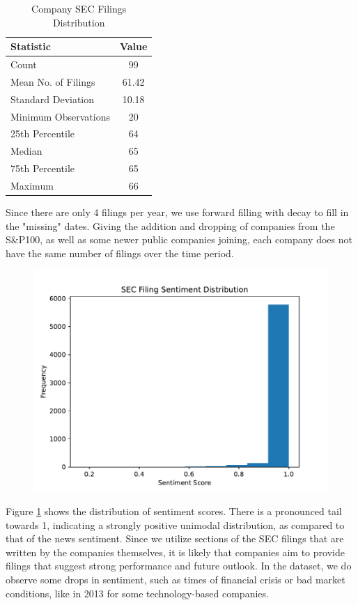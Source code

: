 \begin{table}[htbp]
    \centering
    \caption{Company SEC Filings Distribution}
    \begin{tabular}{l c}
        \toprule
        \textbf{Statistic} & \textbf{Value} \\
        \midrule
        Count & 99 \\
        Mean No. of Filings & 61.42 \\
        Standard Deviation & 10.18 \\
        Minimum Observations & 20 \\
        25th Percentile & 64 \\
        Median & 65 \\
        75th Percentile & 65 \\
        Maximum & 66 \\
        \bottomrule
    \end{tabular}
    \label{table:sec_dist}
\end{table}

Since there are only 4 filings per year, we use forward filling with decay to fill in the "missing" dates.
Giving the addition and dropping of companies from the S\&P100, as well as some newer public companies joining, each company does not have the same number of filings over the time period.

\begin{figure}
  \centering
  \includegraphics[width=.9\textwidth]{../figures/sec_sent_dist}
  \label{fig:sec_dist}
\end{figure}

Figure \ref{fig:sec_dist} shows the distribution of sentiment scores.
There is a pronounced tail towards 1, indicating a strongly positive unimodal distribution, as compared to that of the news sentiment.
Since we utilize sections of the SEC filings that are written by the companies themselves,
it is likely that companies aim to provide filings that suggest strong performance and future outlook.
In the dataset, we do observe some drops in sentiment, such as times of financial crisis or bad market conditions, like in 2013 for some technology-based companies.


